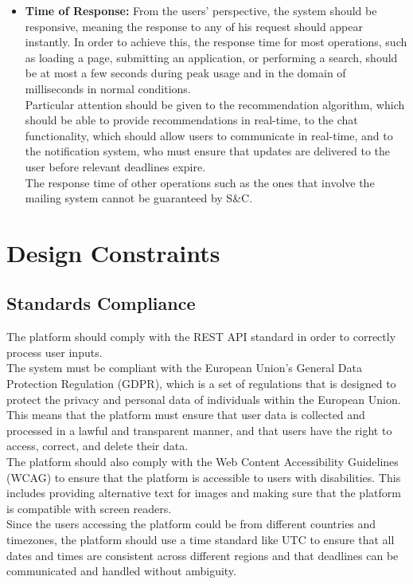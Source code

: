 \begin{itemize}
    \item \textbf{Time of Response:} From the users' perspective, the system should be responsive, meaning the response to any of his request 
    should appear instantly. In order to achieve this, the response time for most operations, such as loading a page, submitting an application, 
    or performing a search, should be at most a few seconds during peak usage and in the domain of milliseconds in normal conditions. \\
    Particular attention should be given to the recommendation algorithm, which should be able to provide recommendations in real-time,
    to the chat functionality, which should allow users to communicate in real-time, and to the notification system, who must ensure that
    updates are delivered to the user before relevant deadlines expire. \\
    The response time of other operations such as the ones that involve the mailing system cannot be guaranteed by S\&C.

\end{itemize}

\section{Design Constraints}

\subsection{Standards Compliance}
The platform should comply with the REST API standard in order to correctly process user inputs. \\
The system must be compliant with the European Union's General Data Protection Regulation (GDPR), which is a set of regulations that is designed
to protect the privacy and personal data of individuals within the European Union. This means that the platform must ensure that user data is
collected and processed in a lawful and transparent manner, and that users have the right to access, correct, and delete their data. \\
The platform should also comply with the Web Content Accessibility Guidelines (WCAG) to ensure that the platform is accessible to users with
disabilities. This includes providing alternative text for images and making sure that the platform is compatible with screen readers. \\
Since the users accessing the platform could be from different countries and timezones, the platform should use a time standard like UTC to
ensure that all dates and times are consistent across different regions and that deadlines can be communicated and handled without ambiguity.

